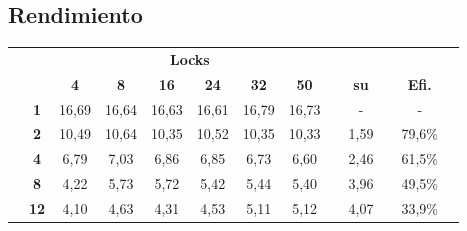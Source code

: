 \subsection{Rendimiento}


\begin{table}[H]
	\centering
	\captionsetup{justification=centering}
	\begin{tabular}{lc|c|c|c|c|c|c|lcccl}
		\cline{3-8}
		& \multicolumn{1}{l|}{} & \multicolumn{6}{c|}{{\bf Locks}}                              &                       & \multicolumn{1}{l}{}          & \multicolumn{1}{l}{}  & \multicolumn{1}{l}{}            &  \\ \cline{3-8} \cline{10-10} \cline{12-12}
		&                       & {\bf 4} & {\bf 8} & {\bf 16} & {\bf 24} & {\bf 32} & {\bf 50} & \multicolumn{1}{l|}{} & \multicolumn{1}{c|}{{\bf su}} & \multicolumn{1}{c|}{} & \multicolumn{1}{c|}{{\bf Efi.}} &  \\ \cline{1-8} \cline{10-10} \cline{12-12}
		\multicolumn{1}{|l|}{\multirow{13}{*}{{\bf \rotatebox[origin=c]{90}{THREADS}}}} & {\bf 1}               & 16,69   & 16,64   & 16,63    & 16,61    & 16,79    & 16,73    & \multicolumn{1}{l|}{} & \multicolumn{1}{c|}{-}        & \multicolumn{1}{c|}{} & \multicolumn{1}{c|}{-}          &  \\ \cline{2-8} \cline{10-10} \cline{12-12}
		\multicolumn{1}{|l|}{}                                & {\bf 2}               & 10,49   & 10,64   & 10,35    & 10,52    & 10,35    & 10,33    & \multicolumn{1}{l|}{} & \multicolumn{1}{c|}{1,59}     & \multicolumn{1}{c|}{} & \multicolumn{1}{c|}{79,6\%}     &  \\ \cline{2-8} \cline{10-10} \cline{12-12}
		\multicolumn{1}{|l|}{}                                & {\bf 4}               & 6,79    & 7,03    & 6,86     & 6,85     & 6,73     & 6,60     & \multicolumn{1}{l|}{} & \multicolumn{1}{c|}{2,46}     & \multicolumn{1}{c|}{} & \multicolumn{1}{c|}{61,5\%}     &  \\ \cline{2-8} \cline{10-10} \cline{12-12}
		\multicolumn{1}{|l|}{}                                & {\bf 8}               & 4,22    & 5,73    & 5,72     & 5,42     & 5,44     & 5,40     & \multicolumn{1}{l|}{} & \multicolumn{1}{c|}{3,96}     & \multicolumn{1}{c|}{} & \multicolumn{1}{c|}{49,5\%}     &  \\ \cline{2-8} \cline{10-10} \cline{12-12}
		\multicolumn{1}{|l|}{}                                & {\bf 12}               & 4,10    & 4,63    & 4,31     & 4,53     & 5,11     & 5,12     & \multicolumn{1}{l|}{} & \multicolumn{1}{c|}{4,07}     & \multicolumn{1}{c|}{} & \multicolumn{1}{c|}{33,9\%}     &  \\ \cline{2-8} \cline{10-10} \cline{12-12}

\end{tabular}
\end{table}
